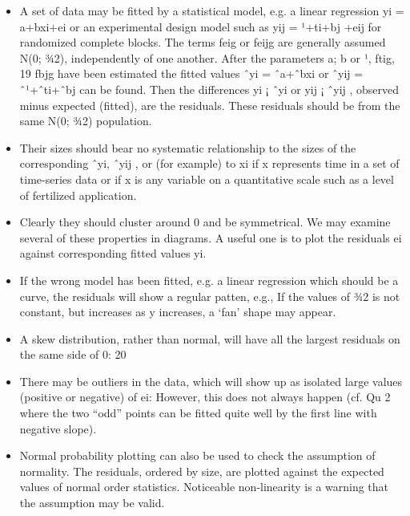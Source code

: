 \documentclass[a4paper,12pt]{article}
\begin{document}
\begin{itemize}
    \item A set of data may be fitted by a statistical model, e.g. a linear regression yi =
a+bxi+ei or an experimental design model such as yij = ¹+ti+bj +eij for
randomized complete blocks. The terms feig or feijg are generally assumed
N(0; ¾2), independently of one another. After the parameters a; b or ¹, ftig,
19
fbjg have been estimated the fitted values ˆyi = ˆa+ˆbxi or ˆyij = ˆ¹+ˆti+ˆbj can
be found. Then the differences yi ¡ ˆyi or yij ¡ ˆyij , observed minus expected
(fitted), are the residuals. These residuals should be from the same N(0; ¾2)
population. 
\item Their sizes should bear no systematic relationship to the sizes
of the corresponding ˆyi, ˆyij , or (for example) to xi if x represents time in a
set of time-series data or if x is any variable on a quantitative scale such as
a level of fertilized application.
\item Clearly they should cluster around 0 and be
symmetrical. We may examine several of these properties in diagrams. A
useful one is to plot the residuals ei against corresponding fitted values yi.
\item If the wrong model has been fitted, e.g. a linear regression which should be
a curve, the residuals will show a regular patten, e.g.,
If the values of ¾2 is not constant, but increases as y increases, a ‘fan’ shape
may appear.
\item A skew distribution, rather than normal, will have all the largest residuals
on the same side of 0:
20
\item There may be outliers in the data, which will show up as isolated large values
(positive or negative) of ei:
However, this does not always happen (cf. Qu 2 where the two “odd” points
can be fitted quite well by the first line with negative slope). 
\item Normal probability
plotting can also be used to check the assumption of normality. The
residuals, ordered by size, are plotted against the expected values of normal
order statistics. Noticeable non-linearity is a warning that the assumption
may be valid.
\end{itemize}
\end{document}
